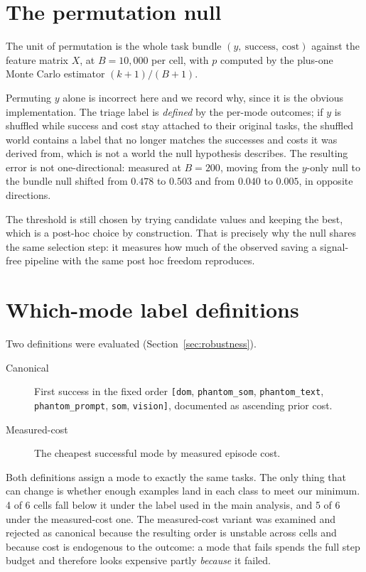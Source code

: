 \FloatBarrier
\section{The permutation null}

The unit of permutation is the whole task bundle $(y,\ \mathrm{success},\
\mathrm{cost})$ against the feature matrix $X$, at $B=10{,}000$ per cell, with
$p$ computed by the plus-one Monte Carlo estimator $(k+1)/(B+1)$.

Permuting $y$ alone is incorrect here and we record why, since it is the obvious
implementation. The triage label is \emph{defined} by the per-mode outcomes; if
$y$ is shuffled while success and cost stay attached to their original tasks,
the shuffled world contains a label that no longer matches the successes and
costs it was derived from, which is not a world the null hypothesis
describes.
The resulting error is not one-directional: measured at $B=200$, moving from the $y$-only null to the bundle null shifted  from $0.478$ to
$0.503$ and \cell{red$\cdot$B2} from $0.040$ to $0.005$, in opposite directions.

The threshold is still chosen by trying candidate values and keeping the best,
which is a post-hoc choice by construction. That is precisely why the
null shares the same selection step: it measures how much of the observed saving
a signal-free pipeline with the same post hoc freedom reproduces.

\FloatBarrier
\section{Which-mode label definitions}

Two definitions were evaluated (Section~\ref{sec:robustness}).

\begin{description}
\item[Canonical] First success in the fixed order \texttt{[dom},
  \texttt{phantom\_som}, \texttt{phantom\_text}, \texttt{phantom\_prompt},
  \texttt{som}, \texttt{vision]}, documented as ascending prior cost.
\item[Measured-cost] The cheapest successful mode by measured episode cost.
\end{description}

Both definitions assign a mode to exactly the same tasks. The only thing that
can change is whether enough examples land in each class to meet our minimum.
4 of 6 cells fall below it under the label used in the main analysis, and 5 of
6 under the
measured-cost one. The measured-cost variant was examined and rejected as
canonical because the resulting order is unstable across cells and because cost is endogenous to the outcome: a mode that fails spends the full step budget
and therefore looks expensive partly \emph{because} it failed.
